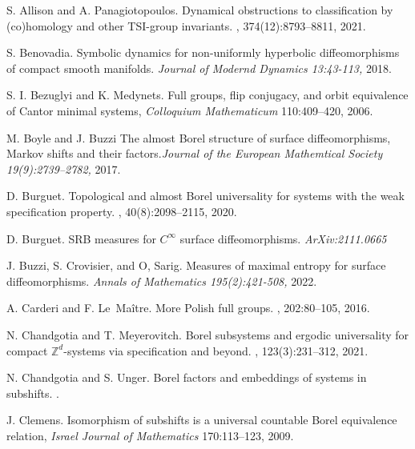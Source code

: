\documentclass{article}
\theoremstyle{definition}
\begin{document}
\begin{thebibliography}{99}




 
	S. Allison and A. Panagiotopoulos.
	\newblock Dynamical obstructions to classification by (co)homology and other
	{{TSI-group}} invariants.
	,
	374(12):8793--8811, 2021.
	
S. Benovadia. Symbolic dynamics for non-uniformly hyperbolic diffeomorphisms of compact smooth manifolds. {\em Journal of Modernd Dynamics 13:43-113,} 2018.

S. I. Bezuglyi and K. Medynets. Full groups, flip conjugacy, and orbit equivalence of Cantor minimal systems, {\em Colloquium Mathematicum} 110:409--420, 2006.

M. Boyle and J. Buzzi The almost Borel structure of surface diffeomorphisms, Markov shifts and their factors.{\em Journal of the European Mathemtical Society 19(9):2739–2782,} 2017.

D. Burguet.
\newblock Topological and almost {B}orel universality for systems with the weak
  specification property.
, 40(8):2098--2115, 2020.

D. Burguet. SRB measures for $C^\infty$ surface diffeomorphisms. {\em ArXiv:2111.0665}

J. Buzzi, S. Crovisier, and O, Sarig. Measures of maximal entropy for surface diffeomorphisms. {\em Annals of Mathematics 195(2):421-508,} 2022.

	A. Carderi and F. Le~Ma{\^i}tre.
	\newblock More {{Polish}} full groups.
	, 202:80--105, 2016.
	
N. Chandgotia and T. Meyerovitch.
\newblock Borel subsystems and ergodic universality for compact $\mathbb
  {Z}^d$-systems via specification and beyond.
,
  123(3):231--312, 2021.

N. Chandgotia and S. Unger.
\newblock Borel factors and embeddings of systems in subshifts.
.

J. Clemens. Isomorphism of subshifts is a universal countable Borel equivalence relation, {\em Israel Journal of Mathematics} 170:113--123, 2009.


\end{thebibliography}
\end{document}
